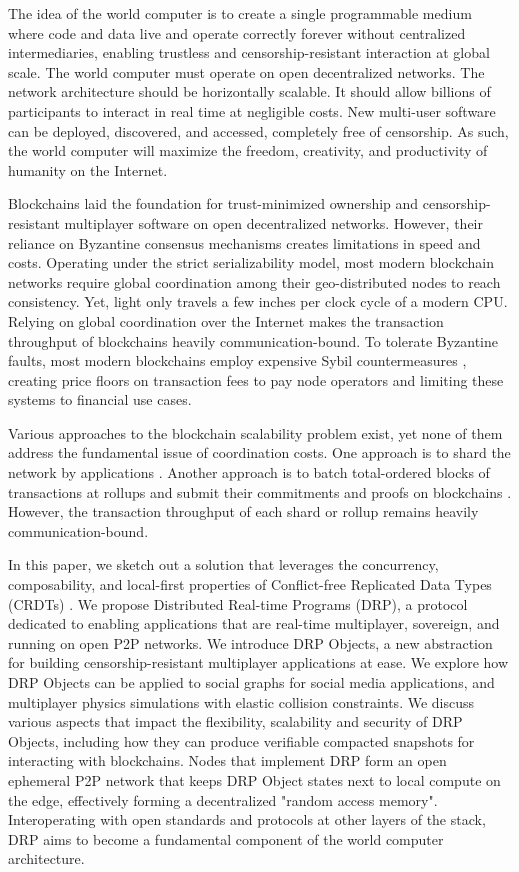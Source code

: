 \documentclass{article}
\begin{document}
The idea of the world computer is to create a single programmable medium where code and data live and operate correctly forever without centralized intermediaries, enabling trustless and censorship-resistant interaction at global scale. The world computer must operate on open decentralized networks. The network architecture should be horizontally scalable. It should allow billions of participants to interact in real time at negligible costs. New multi-user software can be deployed, discovered, and accessed, completely free of censorship. As such, the world computer will maximize the freedom, creativity, and productivity of humanity on the Internet.

Blockchains laid the foundation for trust-minimized ownership and censorship-resistant multiplayer software on open decentralized networks. However, their reliance on Byzantine consensus mechanisms creates limitations in speed and costs. Operating under the strict serializability model, most modern blockchain networks require global coordination among their geo-distributed nodes to reach consistency. Yet, light only travels a few inches per clock cycle of a modern CPU. Relying on global coordination over the Internet makes the transaction throughput of blockchains heavily communication-bound. To tolerate Byzantine faults, most modern blockchains employ expensive Sybil countermeasures \cite{Tendermint,Casper}, creating price floors on transaction fees to pay node operators and limiting these systems to financial use cases.

Various approaches to the blockchain scalability problem exist, yet none of them address the fundamental issue of coordination costs. One approach is to shard the network by applications \cite{Cosmos, RGB}. Another approach is to batch total-ordered blocks of transactions at rollups and submit their commitments and proofs on blockchains \cite{Rollup}. However, the transaction throughput of each shard or rollup remains heavily communication-bound.

In this paper, we sketch out a solution that leverages the concurrency, composability, and local-first \cite{LoFi} properties of Conflict-free Replicated Data Types (CRDTs) \cite{CRDT}. We propose Distributed Real-time Programs (DRP), a protocol dedicated to enabling applications that are real-time multiplayer, sovereign, and running on open P2P networks. We introduce DRP Objects, a new abstraction for building censorship-resistant multiplayer applications at ease. We explore how DRP Objects can be applied to social graphs for social media applications, and multiplayer physics simulations with elastic collision constraints. We discuss various aspects that impact the flexibility, scalability and security of DRP Objects, including how they can produce verifiable compacted snapshots for interacting with blockchains. Nodes that implement DRP form an open ephemeral P2P network that keeps DRP Object states next to local compute on the edge, effectively forming a decentralized "random access memory". Interoperating with open standards and protocols at other layers of the stack, DRP aims to become a fundamental component of the world computer architecture.
\end{document}
